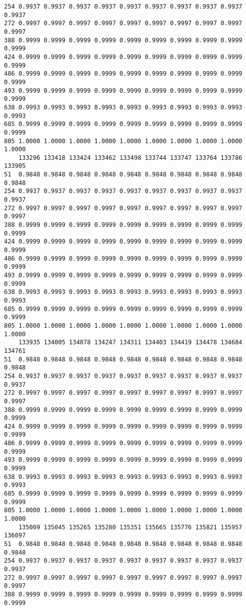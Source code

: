 \documentclass[
]{report}
\begin{document}
\begin{verbatim}
254 0.9937 0.9937 0.9937 0.9937 0.9937 0.9937 0.9937 0.9937 0.9937 0.9937
272 0.9997 0.9997 0.9997 0.9997 0.9997 0.9997 0.9997 0.9997 0.9997 0.9997
388 0.9999 0.9999 0.9999 0.9999 0.9999 0.9999 0.9999 0.9999 0.9999 0.9999
424 0.9999 0.9999 0.9999 0.9999 0.9999 0.9999 0.9999 0.9999 0.9999 0.9999
486 0.9999 0.9999 0.9999 0.9999 0.9999 0.9999 0.9999 0.9999 0.9999 0.9999
493 0.9999 0.9999 0.9999 0.9999 0.9999 0.9999 0.9999 0.9999 0.9999 0.9999
638 0.9993 0.9993 0.9993 0.9993 0.9993 0.9993 0.9993 0.9993 0.9993 0.9993
685 0.9999 0.9999 0.9999 0.9999 0.9999 0.9999 0.9999 0.9999 0.9999 0.9999
805 1.0000 1.0000 1.0000 1.0000 1.0000 1.0000 1.0000 1.0000 1.0000 1.0000
    133296 133418 133424 133462 133498 133744 133747 133764 133786 133905
51  0.9848 0.9848 0.9848 0.9848 0.9848 0.9848 0.9848 0.9848 0.9848 0.9848
254 0.9937 0.9937 0.9937 0.9937 0.9937 0.9937 0.9937 0.9937 0.9937 0.9937
272 0.9997 0.9997 0.9997 0.9997 0.9997 0.9997 0.9997 0.9997 0.9997 0.9997
388 0.9999 0.9999 0.9999 0.9999 0.9999 0.9999 0.9999 0.9999 0.9999 0.9999
424 0.9999 0.9999 0.9999 0.9999 0.9999 0.9999 0.9999 0.9999 0.9999 0.9999
486 0.9999 0.9999 0.9999 0.9999 0.9999 0.9999 0.9999 0.9999 0.9999 0.9999
493 0.9999 0.9999 0.9999 0.9999 0.9999 0.9999 0.9999 0.9999 0.9999 0.9999
638 0.9993 0.9993 0.9993 0.9993 0.9993 0.9993 0.9993 0.9993 0.9993 0.9993
685 0.9999 0.9999 0.9999 0.9999 0.9999 0.9999 0.9999 0.9999 0.9999 0.9999
805 1.0000 1.0000 1.0000 1.0000 1.0000 1.0000 1.0000 1.0000 1.0000 1.0000
    133935 134005 134078 134247 134311 134403 134419 134478 134684 134761
51  0.9848 0.9848 0.9848 0.9848 0.9848 0.9848 0.9848 0.9848 0.9848 0.9848
254 0.9937 0.9937 0.9937 0.9937 0.9937 0.9937 0.9937 0.9937 0.9937 0.9937
272 0.9997 0.9997 0.9997 0.9997 0.9997 0.9997 0.9997 0.9997 0.9997 0.9997
388 0.9999 0.9999 0.9999 0.9999 0.9999 0.9999 0.9999 0.9999 0.9999 0.9999
424 0.9999 0.9999 0.9999 0.9999 0.9999 0.9999 0.9999 0.9999 0.9999 0.9999
486 0.9999 0.9999 0.9999 0.9999 0.9999 0.9999 0.9999 0.9999 0.9999 0.9999
493 0.9999 0.9999 0.9999 0.9999 0.9999 0.9999 0.9999 0.9999 0.9999 0.9999
638 0.9993 0.9993 0.9993 0.9993 0.9993 0.9993 0.9993 0.9993 0.9993 0.9993
685 0.9999 0.9999 0.9999 0.9999 0.9999 0.9999 0.9999 0.9999 0.9999 0.9999
805 1.0000 1.0000 1.0000 1.0000 1.0000 1.0000 1.0000 1.0000 1.0000 1.0000
    135009 135045 135265 135280 135351 135665 135776 135821 135957 136097
51  0.9848 0.9848 0.9848 0.9848 0.9848 0.9848 0.9848 0.9848 0.9848 0.9848
254 0.9937 0.9937 0.9937 0.9937 0.9937 0.9937 0.9937 0.9937 0.9937 0.9937
272 0.9997 0.9997 0.9997 0.9997 0.9997 0.9997 0.9997 0.9997 0.9997 0.9997
388 0.9999 0.9999 0.9999 0.9999 0.9999 0.9999 0.9999 0.9999 0.9999 0.9999

\end{verbatim}
\end{document}
